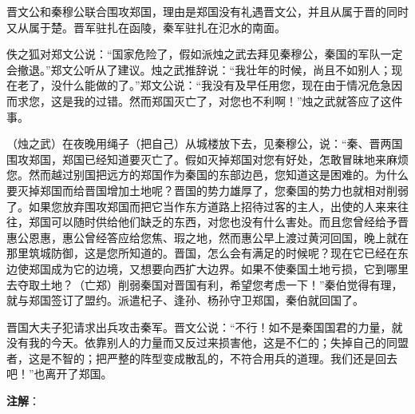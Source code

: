 \documentclass[12pt,UTF-8,openany,a4]{ctexbook}
\begin{document}
\begin{large}
    \yiwen 
    晋文公和秦穆公联合围攻郑国，理由是郑国没有礼遇晋文公，并且从属于晋的同时又从属于楚。晋军驻扎在函陵，秦军驻扎在氾水的南面。
    
    佚之狐对郑文公说：“国家危险了，假如派烛之武去拜见秦穆公，秦国的军队一定会撤退。”郑文公听从了建议。烛之武推辞说：“我壮年的时候，尚且不如别人；现在老了，没什么能做的了。”郑文公说：“我没有及早任用您，现在由于情况危急因而求您，这是我的过错。然而郑国灭亡了，对您也不利啊！”烛之武就答应了这件事。
    
    （烛之武）在夜晚用绳子（把自己）从城楼放下去，见秦穆公，说：“秦、晋两国围攻郑国，郑国已经知道要灭亡了。假如灭掉郑国对您有好处，怎敢冒昧地来麻烦您。然而越过别国把远方的郑国作为秦国的东部边邑，您知道这是困难的。为什么要灭掉郑国而给晋国增加土地呢？晋国的势力雄厚了，您秦国的势力也就相对削弱了。如果您放弃围攻郑国而把它当作东方道路上招待过客的主人，出使的人来来往往，郑国可以随时供给他们缺乏的东西，对您也没有什么害处。而且您曾经给予晋惠公恩惠，惠公曾经答应给您焦、瑕之地，然而惠公早上渡过黄河回国，晚上就在那里筑城防御，这是您所知道的。晋国，怎么会有满足的时候呢？现在它已经在东边使郑国成为它的边境，又想要向西扩大边界。如果不使秦国土地亏损，它到哪里去夺取土地？（亡郑）削弱秦国对晋国有利，希望您考虑一下！”秦伯觉得有理，就与郑国签订了盟约。派遣杞子、逢孙、杨孙守卫郑国，秦伯就回国了。
    
    晋国大夫子犯请求出兵攻击秦军。晋文公说：“不行！如不是秦国国君的力量，就没有我的今天。依靠别人的力量而又反过来损害他，这是不仁的；失掉自己的同盟者，这是不智的；把严整的阵型变成散乱的，不符合用兵的道理。我们还是回去吧！”也离开了郑国。
    
\end{large}


\newpage

\begin{Large}
   \noindent \textbf{注解}：
\end{Large}

\vspace{-1em}
\end{document}

